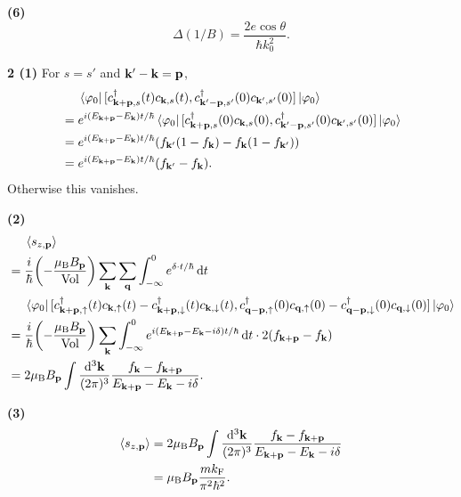 \documentclass{article}
\makeatletter
\newcommand*{\shifttext}[1]{%
  \settowidth{\@tempdima}{#1}%
  \hspace{-\@tempdima}#1%
}
\newcommand{\plabel}[1]{%
\shifttext{\textbf{#1}\quad}%
}
\newcommand{\prule}{%
\begin{center}%
\hdashrule[0.5ex]{.99\linewidth}{1pt}{1pt 2.5pt}%
\end{center}%
}
\newcommand{\minusbaseline}{\abovedisplayskip=0pt\abovedisplayshortskip=0pt~\vspace*{-\baselineskip}}%
\makeatother
\begin{document}
\plabel{(6)}%
\begingroup\minusbaseline%
\[ \Delta(1/B) = \frac{2e\cos\theta}{\hbar k_0^2}. \]
\endgroup

\prule

\plabel{2 (1)}%
For $s=s'$ and $\vb{k}' - \vb{k} = \vb{p}$,
\begin{align*}
    &\phantom{{}={}}\bra{\varphi_0}[c^\dagger_{\vb{k}+\vb{p},s}(t)c_{\vb{k},s}(t), c^\dagger_{\vb{k}'-\vb{p},s'}(0)c_{\vb{k}',s'}(0)] \ket{\varphi_0} \\
    &= e^{i(E_{\vb{k}+\vb{p}} - E_{\vb{k}})t/\hbar}\bra{\varphi_0}[c^\dagger_{\vb{k}+\vb{p},s}(0)c_{\vb{k},s}(0), c^\dagger_{\vb{k}'-\vb{p},s'}(0)c_{\vb{k}',s'}(0)] \ket{\varphi_0} \\
    &= e^{i(E_{\vb{k}+\vb{p}} - E_{\vb{k}})t/\hbar}\qty(f_{\vb{k}'}(1-f_{\vb{k}}) - f_{\vb{k}}(1-f_{\vb{k}'})) \\
    &= e^{i(E_{\vb{k}+\vb{p}} - E_{\vb{k}})t/\hbar}(f_{\vb{k}'} - f_{\vb{k}}).
\end{align*}
Otherwise this vanishes.

\plabel{(2)}%
\begingroup\minusbaseline%
\begin{align*}
    &\phantom{{}={}}\expval{s_{z,\vb{p}}} \\
    &= \frac{i}{\hbar} \qty(- \frac{\mu_{\mathrm{B}} B_{\vb{p}}}{\mathrm{Vol}}) \sum_{\vb{k}} \sum_{\vb{q}} \int_{-\infty}^0 e^{\delta \cdot t/\hbar} \dd{t} \\
    &\phantom{{}={}}\bra{\varphi_0}[c^\dagger_{\vb{k} + \vb{p},\uparrow}(t)c_{\vb{k},\uparrow}(t) - c^\dagger_{\vb{k}+\vb{p},\downarrow}(t)c_{\vb{k},\downarrow}(t),c^\dagger_{\vb{q} - \vb{p},\uparrow}(0)c_{\vb{q},\uparrow}(0) - c^\dagger_{\vb{q}-\vb{p},\downarrow}(0)c_{\vb{q},\downarrow}(0)] \ket{\varphi_0} \\
    &= \frac{i}{\hbar} \qty(- \frac{\mu_{\mathrm{B}} B_{\vb{p}}}{\mathrm{Vol}}) \sum_{\vb{k}} \int_{-\infty}^0 e^{i(E_{\vb{k}+\vb{p}} - E_{\vb{k}}-i\delta)t/\hbar} \dd{t} \cdot 2 \qty(f_{\vb{k}+\vb{p}} - f_{\vb{k}}) \\
    &= 2\mu_{\mathrm{B}}B_{\vb{p}} \int \frac{\dd[3]{\vb{k}}}{(2\pi)^3} \frac{f_{\vb{k}} - f_{\vb{k}+\vb{p}}}{E_{\vb{k}+\vb{p}} - E_{\vb{k}} - i\delta}.
\end{align*}
\endgroup

\plabel{(3)}%
\begingroup\minusbaseline%
\begin{align*}
    \expval{s_{z,\vb{p}}} &= 2\mu_{\mathrm{B}}B_{\vb{p}} \int \frac{\dd[3]{\vb{k}}}{(2\pi)^3} \frac{f_{\vb{k}} - f_{\vb{k}+\vb{p}}}{E_{\vb{k}+\vb{p}} - E_{\vb{k}} - i\delta} \\
    &= \mu_{\mathrm{B}}B_{\vb{p}} \frac{m k_{\mathrm{F}}}{\pi^2 \hbar^2}.
\end{align*}
\endgroup
\end{document}
